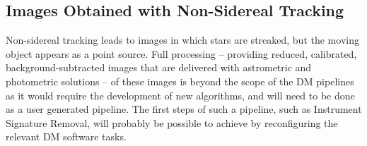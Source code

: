 \documentclass[DM,lsstdoc,toc]{lsstdoc}
\begin{document}
\subsection{Images Obtained with Non-Sidereal Tracking}

Non-sidereal tracking leads to images in which stars are streaked, but the moving object appears as a point source.
Full processing -- providing reduced, calibrated, background-subtracted images that are delivered with astrometric and photometric solutions -- of these images is beyond the scope of the DM pipelines as it would require the development of new algorithms, and will need to be done as a user generated pipeline.
The first steps of such a pipeline, such as Instrument Signature Removal, will probably be possible to achieve by reconfiguring the relevant DM software tasks.




\end{document}
